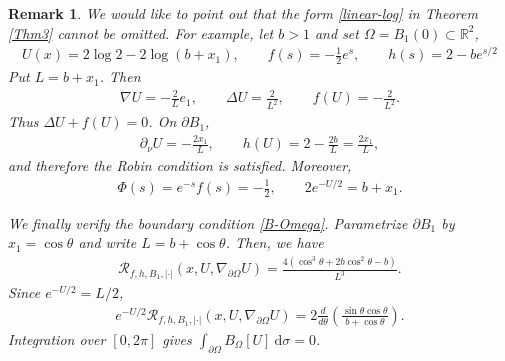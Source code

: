 \documentclass[10pt,a4paper]{amsart}
\numberwithin{equation}{section}
\newtheorem{rmk}[thm]{Remark}
\newcommand{\pa}{\partial}
\newcommand{\R}{\mathbb{R}}
\newcommand{\calR}{\mathcal{R}}
\begin{document}
\begin{rmk}\label{ex:affine-equality-profile}
We would like to point out that the form \eqref{linear-log} in Theorem \ref{Thm3} cannot be omitted. For example, let $b>1$ and set $\Omega = B_1(0) \subset \R^2$,
\begin{align*}
       U(x)=2\log2-2\log(b+x_1), \qquad f(s)=-\frac12e^s,
       \qquad h(s)=2-be^{s/2}
\end{align*}
Put $L=b+x_1$.  Then
\begin{align*}
       \nabla U=-\frac{2}{L} e_1, \qquad \Delta U=\frac2{L^2},  \qquad f(U)=-\frac2{L^2}.
\end{align*}
Thus $\Delta U+f(U)=0$. On $\partial B_1$,
\begin{align*}
       \partial_\nu U=-\frac{2x_1}{L},
       \qquad h(U)=2-\frac{2b}{L}=\frac{2x_1}{L},
\end{align*}
and therefore the Robin condition is satisfied.  Moreover,
\begin{align*}
       \Phi(s)=e^{-s}f(s)=-\frac12,
       \qquad 2e^{-U/2}=b+x_1.
\end{align*}

We finally verify the boundary condition \eqref{B-Omega}.  Parametrize $\partial B_1$ by $x_1=\cos\theta$ and write $L=b+\cos\theta$. Then, we have
\begin{align*}
       \calR_{f,h,B_1,|\cdot|}
       (x,U,\nabla_{\pa \Omega} U)
       =\frac{4(\cos^3\theta+2b\cos^2\theta-b)}{L^3}.
\end{align*}
Since $e^{-U/2}=L/2$,
\begin{align*}
e^{-U/2}\calR_{f,h,B_1,|\cdot|}
       (x,U,\nabla_{\pa \Omega} U)
       =2\frac{d}{d\theta}
       \left(\frac{\sin\theta\cos\theta}{b+\cos\theta}\right).
\end{align*}
Integration over $[0,2\pi]$ gives $\int_{\pa \Omega} B_{\Omega}[U] \ \text{d} \sigma =0$.
\end{rmk}
\end{document}
